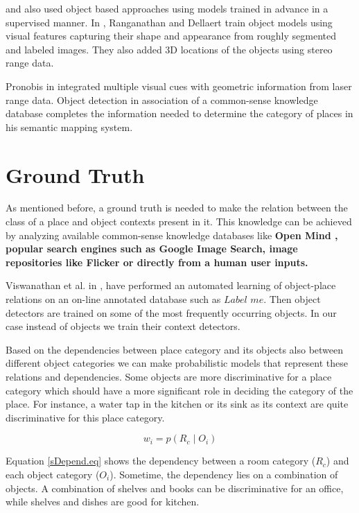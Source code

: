 \cite{ranganathan2007semantic} and \cite{P.Viswanathan} also used object based approaches using models trained in 
advance in a supervised manner. 
In \cite{ranganathan2007semantic}, Ranganathan and Dellaert train object models using visual features capturing their 
shape and appearance from roughly segmented and labeled images. 
They also added 3D locations of the objects using stereo range data.
 
Pronobis in \cite{pronobis2011phd} integrated multiple visual cues with geometric information from laser range data. 
Object detection in association of a common-sense knowledge database completes the information needed to determine the category of places in his semantic mapping system.
 
\section{Ground Truth}
\label{GroundTruth.sec}
As mentioned before, a ground truth is needed to make the relation between the class of a place and object contexts 
present in it.
This knowledge can be achieved by analyzing available common-sense knowledge databases like \bf{Open Mind} \cite{OpenMind}, 
popular search engines such as Google Image Search, image repositories like Flicker or directly from a human user 
inputs. 

Viswanathan et al. in \cite{P.Viswanathan}, have performed an automated learning of object-place relations on an on-line annotated database such as $Label$ $me$. 
Then object detectors are trained on some of the most frequently occurring objects.
In our case instead of objects we train their context detectors.

Based on the dependencies between place category and its objects also between different object categories we can make 
probabilistic models that represent these relations and dependencies.
Some objects are more discriminative for a place category which should have a more significant role in deciding the 
category of the place.
For instance, a water tap in the kitchen or its sink as its context are quite discriminative for this place category.

\begin{equation}
 \label{sDepend.eq}
 w_i = p(R_c \mid O_i) 
\end{equation}

Equation \ref{sDepend.eq} shows the dependency between a room category ($R_c$) and each object category ($O_i$).
Sometime, the dependency lies on a combination of objects.
A combination of shelves and books can be discriminative for an office, while shelves and dishes are good for kitchen.

